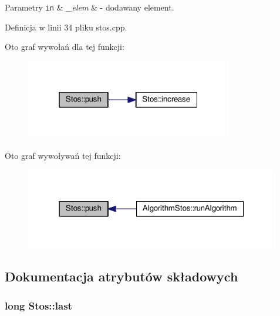 \begin{DoxyParams}[1]{Parametry}
\mbox{\tt in}  & {\em \-\_\-elem} & -\/ dodawany element. \\
\hline
\end{DoxyParams}


Definicja w linii 34 pliku stos.\-cpp.



Oto graf wywołań dla tej funkcji\-:\nopagebreak
\begin{figure}[H]
\begin{center}
\leavevmode
\includegraphics[width=256pt]{class_stos_afd5802e405946328cccca3eed676b493_cgraph}
\end{center}
\end{figure}




Oto graf wywoływań tej funkcji\-:\nopagebreak
\begin{figure}[H]
\begin{center}
\leavevmode
\includegraphics[width=316pt]{class_stos_afd5802e405946328cccca3eed676b493_icgraph}
\end{center}
\end{figure}




\subsection{Dokumentacja atrybutów składowych}
\hypertarget{class_stos_ae0623cdf9b6725e38da86b74972d61ba}{
\subsubsection[{last}]{\setlength{\rightskip}{0pt plus 5cm}long Stos\-::last\hspace{0.3cm}{\ttfamily [private]}}}\label{class_stos_ae0623cdf9b6725e38da86b74972d61ba}


